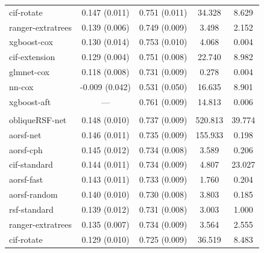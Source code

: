 \documentclass{article}\usepackage[]{graphicx}\usepackage[]{xcolor}
\newenvironment{knitrout}{}{} %
\begin{document}
\begin{knitrout}
\begin{longtable}[t]{lcccc}
\hspace{1em}cif-rotate & 0.147 (0.011) & 0.751 (0.011) & 34.328 & 8.629\\
\hspace{1em}ranger-extratrees & 0.139 (0.006) & 0.749 (0.009) & 3.498 & 2.152\\
\hspace{1em}xgboost-cox & 0.130 (0.014) & 0.753 (0.010) & 4.068 & 0.004\\
\hspace{1em}cif-extension & 0.129 (0.004) & 0.751 (0.008) & 22.740 & 8.982\\
\hspace{1em}glmnet-cox & 0.118 (0.008) & 0.731 (0.009) & 0.278 & 0.004\\
\hspace{1em}nn-cox & -0.009 (0.042) & 0.531 (0.050) & 16.635 & 8.901\\
\hspace{1em}xgboost-aft & --- & 0.761 (0.009) & 14.813 & 0.006\\
\addlinespace[0.3em]
\multicolumn{5}{l}{\textit{\textbf{Rotterdam tumor bank; recurrence, n = 2982, p = 11}}}\\
\hline
\hspace{1em}obliqueRSF-net & 0.148 (0.010) & 0.737 (0.009) & 520.813 & 39.774\\
\hspace{1em}aorsf-net & 0.146 (0.011) & 0.735 (0.009) & 155.933 & 0.198\\
\hspace{1em}aorsf-cph & 0.145 (0.012) & 0.734 (0.008) & 3.589 & 0.206\\
\hspace{1em}cif-standard & 0.144 (0.011) & 0.734 (0.009) & 4.807 & 23.027\\
\hspace{1em}aorsf-fast & 0.143 (0.011) & 0.733 (0.009) & 1.760 & 0.204\\
\hspace{1em}aorsf-random & 0.140 (0.010) & 0.730 (0.008) & 3.803 & 0.185\\
\hspace{1em}rsf-standard & 0.139 (0.012) & 0.731 (0.008) & 3.003 & 1.000\\
\hspace{1em}ranger-extratrees & 0.135 (0.007) & 0.734 (0.009) & 3.564 & 2.555\\
\hspace{1em}cif-rotate & 0.129 (0.010) & 0.725 (0.009) & 36.519 & 8.483\\

\end{longtable}
\end{knitrout}
\end{document}
